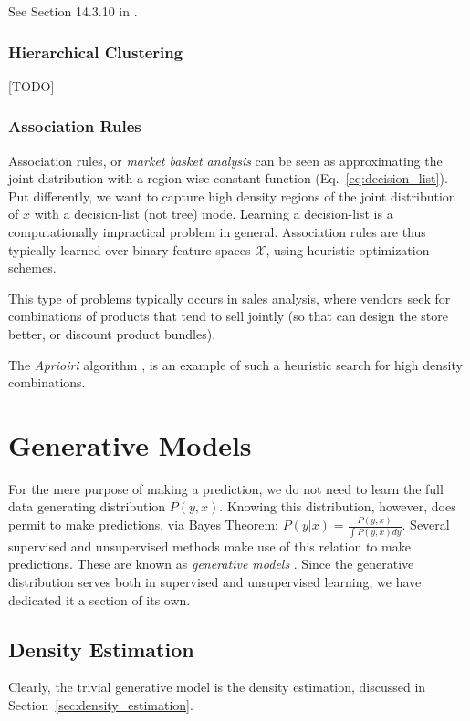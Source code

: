 \documentclass[12pt,a4paper]{article}
\theoremstyle{plain}
\theoremstyle{definition}
\newcommand{\dist}{P}
\newcommand{\featureS}{\mathcal{X}}
\begin{document}
See Section 14.3.10 in \cite{hastie_elements_2003}.


\subsubsection{Hierarchical Clustering}
\label{sec:hierarchical}
[TODO]



\subsubsection{Association Rules}
\label{sec:association}
Association rules, or \emph{market basket analysis} can be seen as approximating the joint distribution with a region-wise constant function (Eq.~\ref{eq:decision_list}).
Put differently, we want to capture high density regions of the joint distribution of $x$ with a decision-list (not tree) mode.
Learning a decision-list is a computationally impractical problem in general. Association rules are thus typically learned over binary feature spaces $\featureS$, using heuristic optimization schemes.

This type of problems typically occurs in sales analysis, where vendors seek for combinations of products that tend to sell jointly (so that can design the store better, or discount product bundles).

The \emph{Aprioiri} algorithm \cite{agraval_fast_1994}, is an example of such a heuristic search for high density combinations.








\section{Generative Models}
For the mere purpose of making a prediction, we do not need to learn the full data generating distribution $\dist(y,x)$. 
Knowing this distribution, however, does permit to make predictions, via Bayes Theorem: 
$\dist(y|x)=\frac{\dist(y,x)}{\int\dist(y,x)dy}$.
Several supervised and unsupervised methods make use of this relation to make predictions. These are known as \emph{generative models} .
Since the generative distribution serves both in supervised and unsupervised learning, we have dedicated it a section of its own.

\subsection{Density Estimation}
Clearly, the trivial generative model is the density estimation, discussed in Section~\ref{sec:density_estimation}.
\end{document}
